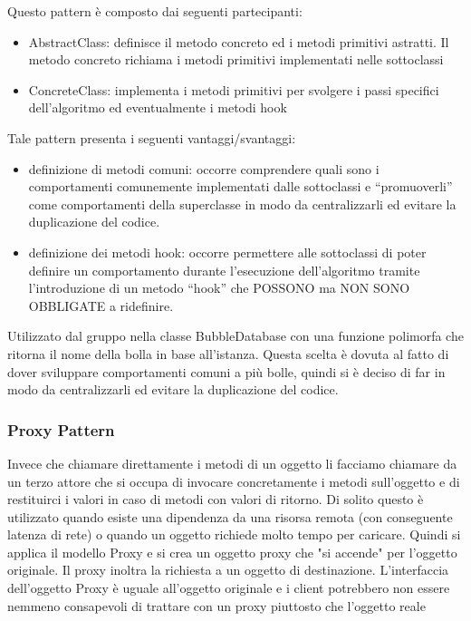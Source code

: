 Questo pattern è composto dai seguenti partecipanti:
\begin{itemize}
	\item AbstractClass: definisce il metodo concreto ed i metodi primitivi astratti. Il metodo concreto richiama i metodi primitivi implementati nelle sottoclassi
	\item ConcreteClass: implementa i metodi primitivi per svolgere i passi specifici dell’algoritmo ed eventualmente i metodi hook
\end{itemize}

Tale pattern presenta i seguenti vantaggi/svantaggi:
\begin{itemize}
	\item definizione di metodi comuni: occorre comprendere quali sono i comportamenti comunemente implementati dalle sottoclassi e “promuoverli” come comportamenti della superclasse in modo da centralizzarli ed evitare la duplicazione del codice.
	\item definizione dei metodi hook: occorre permettere alle sottoclassi di poter definire un comportamento durante l’esecuzione dell’algoritmo tramite l’introduzione di un metodo “hook” che POSSONO ma NON SONO OBBLIGATE a ridefinire.
\end{itemize}

Utilizzato dal gruppo nella classe BubbleDatabase con una funzione polimorfa che ritorna il nome della bolla in base all'istanza.
Questa scelta è dovuta al fatto di dover sviluppare comportamenti comuni a più bolle, quindi si è deciso di far in modo da centralizzarli ed evitare la duplicazione del codice.

\subsubsection{Proxy Pattern}
Invece che chiamare direttamente i metodi di un oggetto li facciamo chiamare da un terzo attore che si occupa di invocare concretamente i metodi sull'oggetto e di restituirci i valori in caso di metodi con valori di ritorno. 
Di solito questo è utilizzato quando esiste una dipendenza da una risorsa remota (con conseguente latenza di rete) o quando un oggetto richiede molto tempo per caricare.
Quindi si applica il modello Proxy e si crea un oggetto proxy che "si accende" per l'oggetto originale. Il proxy inoltra la richiesta a un oggetto di destinazione. L'interfaccia dell'oggetto Proxy è uguale all'oggetto originale e i client potrebbero non essere nemmeno consapevoli di trattare con un proxy piuttosto che l'oggetto reale


